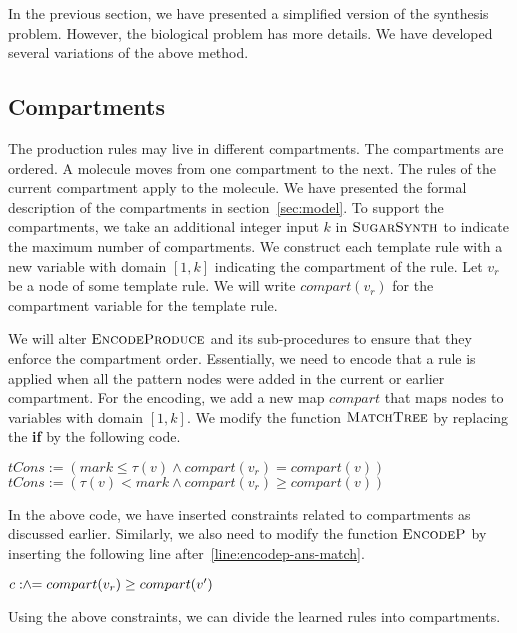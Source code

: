 In the previous section, we have presented a simplified version of
the synthesis problem.
However, the biological problem has more details.
We have developed %
several variations of the
above method.

\subsection{Compartments}

The production rules may live in different compartments.
The compartments are ordered.
A molecule moves from one compartment to the next.
The rules of the current compartment apply to the molecule.
We have presented the formal description of the compartments in
section~\ref{sec:model}.
To support the compartments, we take an additional integer
input $k$ in $\textsc{SugarSynth}$ to indicate the maximum number
of compartments.
We construct each template rule with a new variable with domain $[1,k]$
indicating the compartment of the rule.
Let $v_r$ be a node of some template rule. We will write $compart(v_r)$
for the compartment variable for the template rule.

We will alter $\textsc{EncodeProduce}$ and its sub-procedures to
ensure that they enforce the compartment order.
Essentially, we need to encode that a rule is applied when all the
pattern nodes were added in the current or earlier compartment.
For the encoding, we add a new map $compart$ that maps
nodes to variables with domain $[1,k]$.
We modify the function $\textsc{MatchTree}$ by replacing
the {\bf if} by the following code.
\begin{algorithmic}[1]
  \vspace{1ex}
   \State $tCons := ( mark \leq \tau(v)  \land compart(v_r) = compart(v) )$
  \Else
   \State $tCons := ( \tau(v) < mark  \land compart(v_r) \geq compart(v) )$
   \EndIf
   \vspace{1ex}
\end{algorithmic}
In the above code, we have inserted constraints related to compartments
as discussed earlier.
Similarly, we also need to modify the function
$\textsc{EncodeP}$ by inserting the following line after~\ref{line:encodep-ans-match}.
\begin{algorithmic}[1]
  \vspace{1ex}
  \State $c \mathrel{:\hspace{-3pt}\land\hspace{-3pt}=} compart(v_r) \geq compart(v')$
  \vspace{1ex}
\end{algorithmic}
Using the above constraints, we can divide the learned rules
into compartments.

